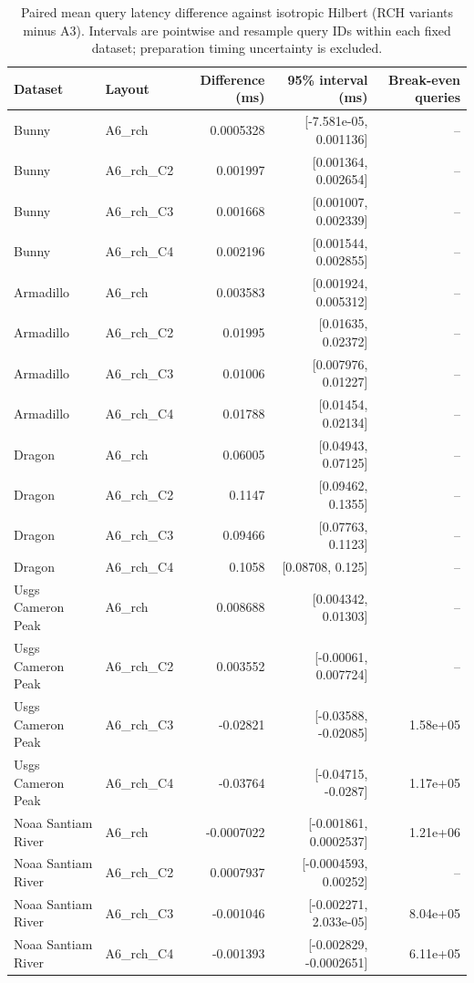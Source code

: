 \begin{table}[tbp]\centering\small
\caption{Paired mean query latency difference against isotropic Hilbert (RCH variants minus A3). Intervals are pointwise and resample query IDs within each fixed dataset; preparation timing uncertainty is excluded.}
\label{tab:application_paired}
\begin{tabular}{llrrr}\toprule Dataset & Layout & Difference (ms) & 95\% interval (ms) & Break-even queries \\ \midrule
Bunny & A6\_rch & 0.0005328 & [-7.581e-05, 0.001136] & -- \\
Bunny & A6\_rch\_C2 & 0.001997 & [0.001364, 0.002654] & -- \\
Bunny & A6\_rch\_C3 & 0.001668 & [0.001007, 0.002339] & -- \\
Bunny & A6\_rch\_C4 & 0.002196 & [0.001544, 0.002855] & -- \\
Armadillo & A6\_rch & 0.003583 & [0.001924, 0.005312] & -- \\
Armadillo & A6\_rch\_C2 & 0.01995 & [0.01635, 0.02372] & -- \\
Armadillo & A6\_rch\_C3 & 0.01006 & [0.007976, 0.01227] & -- \\
Armadillo & A6\_rch\_C4 & 0.01788 & [0.01454, 0.02134] & -- \\
Dragon & A6\_rch & 0.06005 & [0.04943, 0.07125] & -- \\
Dragon & A6\_rch\_C2 & 0.1147 & [0.09462, 0.1355] & -- \\
Dragon & A6\_rch\_C3 & 0.09466 & [0.07763, 0.1123] & -- \\
Dragon & A6\_rch\_C4 & 0.1058 & [0.08708, 0.125] & -- \\
Usgs Cameron Peak & A6\_rch & 0.008688 & [0.004342, 0.01303] & -- \\
Usgs Cameron Peak & A6\_rch\_C2 & 0.003552 & [-0.00061, 0.007724] & -- \\
Usgs Cameron Peak & A6\_rch\_C3 & -0.02821 & [-0.03588, -0.02085] & 1.58e+05 \\
Usgs Cameron Peak & A6\_rch\_C4 & -0.03764 & [-0.04715, -0.0287] & 1.17e+05 \\
Noaa Santiam River & A6\_rch & -0.0007022 & [-0.001861, 0.0002537] & 1.21e+06 \\
Noaa Santiam River & A6\_rch\_C2 & 0.0007937 & [-0.0004593, 0.00252] & -- \\
Noaa Santiam River & A6\_rch\_C3 & -0.001046 & [-0.002271, 2.033e-05] & 8.04e+05 \\
Noaa Santiam River & A6\_rch\_C4 & -0.001393 & [-0.002829, -0.0002651] & 6.11e+05 \\

\end{tabular}
\end{table}
